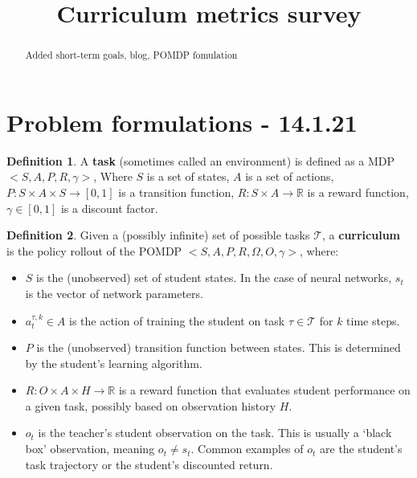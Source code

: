 \documentclass[letterpaper]{article}
\title{Curriculum metrics survey}
\theoremstyle{definition}
\newtheorem{defn}{Definition}[section]
\begin{document}
	\maketitle
	\begin{abstract}
		Added short-term goals, blog, POMDP fomulation
	\end{abstract}

\tableofcontents

\section{Problem formulations - 14.1.21} \label{sec:formulation}
\begin{defn}
	A \textbf{task} (sometimes called an environment) is defined as a MDP $<S,A,P,R,\gamma>$,
	Where $S$ is a set of states, $A$ is a set of actions, $P:S\times A\times S\rightarrow [0,1]$ is a transition function, 
	$R:S\times A\rightarrow \mathbb{R}$ is a reward function, $\gamma\in[0,1]$ is a discount factor.
\end{defn}

\begin{defn} \label{defn:curriculum-pomdp}
	Given a (possibly infinite) set of possible tasks $\mathcal{T}$, a \textbf{curriculum} is the policy rollout of the POMDP $<S,A,P,R,\Omega,O, \gamma>$, where:
	\begin{itemize}
		\item $S$ is the (unobserved) set of student states. In the case of neural networks, $s_t$ is the vector of network parameters.
		\item $a_{t}^{\tau, k}\in A$ is the action of training the student on task $\tau\in \mathcal{T}$ for $k$ time steps.
		\item $P$ is the (unobserved) transition function between states. This is determined by the student's learning algorithm.
		\item $R:O\times A\times H \rightarrow \mathbb{R}$ is a reward function that evaluates student performance on a given task, possibly based on observation history $H$.
		\item $o_t$ is the teacher's student observation on the task. This is usually a `black box' observation, meaning $o_t\neq s_t$. Common examples of $o_t$ are the student's task trajectory or the student's discounted return.
	\end{itemize}	
\end{defn}
\end{document}
